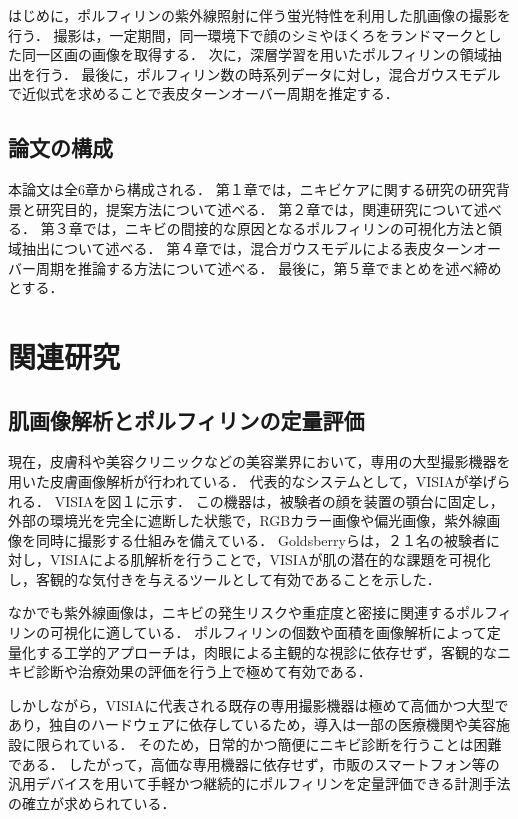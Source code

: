 \documentclass[book,paper=a4,fontsize=16pt,openany]{jlreq}
\begin{document}
はじめに，ポルフィリンの紫外線照射に伴う蛍光特性を利用した肌画像の撮影を行う．
撮影は，一定期間，同一環境下で顔のシミやほくろをランドマークとした同一区画の画像を取得する．
次に，深層学習を用いたポルフィリンの領域抽出を行う．
最後に，ポルフィリン数の時系列データに対し，混合ガウスモデルで近似式を求めることで表皮ターンオーバー周期を推定する．


\newpage
\section{論文の構成}
本論文は全6章から構成される．
第１章では，ニキビケアに関する研究の研究背景と研究目的，提案方法について述べる．
第２章では，関連研究について述べる．
第３章では，ニキビの間接的な原因となるポルフィリンの可視化方法と領域抽出について述べる．
第４章では，混合ガウスモデルによる表皮ターンオーバー周期を推論する方法について述べる．
最後に，第５章でまとめを述べ締めとする．

\chapter{関連研究}
\section{肌画像解析とポルフィリンの定量評価}
現在，皮膚科や美容クリニックなどの美容業界において，専用の大型撮影機器を用いた皮膚画像解析が行われている．
代表的なシステムとして，VISIAが挙げられる．
VISIAを図１に示す．
この機器は，被験者の顔を装置の顎台に固定し，外部の環境光を完全に遮断した状態で，RGBカラー画像や偏光画像，紫外線画像を同時に撮影する仕組みを備えている．
Goldsberryらは，２１名の被験者に対し，VISIAによる肌解析を行うことで，VISIAが肌の潜在的な課題を可視化し，客観的な気付きを与えるツールとして有効であることを示した．

なかでも紫外線画像は，ニキビの発生リスクや重症度と密接に関連するポルフィリンの可視化に適している．
ポルフィリンの個数や面積を画像解析によって定量化する工学的アプローチは，肉眼による主観的な視診に依存せず，客観的なニキビ診断や治療効果の評価を行う上で極めて有効である．

しかしながら，VISIAに代表される既存の専用撮影機器は極めて高価かつ大型であり，独自のハードウェアに依存しているため，導入は一部の医療機関や美容施設に限られている．
そのため，日常的かつ簡便にニキビ診断を行うことは困難である．
したがって，高価な専用機器に依存せず，市販のスマートフォン等の汎用デバイスを用いて手軽かつ継続的にポルフィリンを定量評価できる計測手法の確立が求められている．
\end{document}
